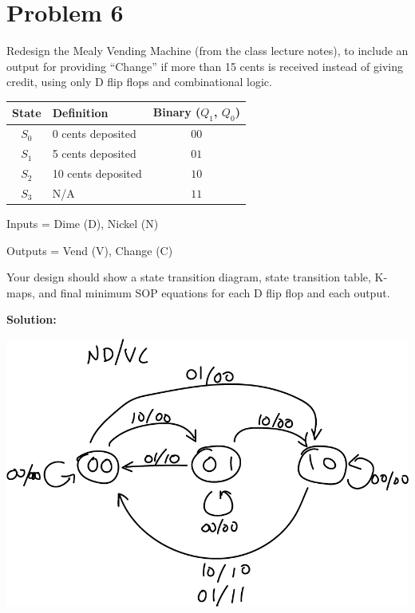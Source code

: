 \documentclass{article}
\begin{document}
    
    \section*{Problem 6}

    Redesign the Mealy Vending Machine (from the class lecture notes), to include an 
    output for providing “Change” if more than 15 cents is received instead of giving 
    credit, using only D flip flops and combinational logic.

    \begin{center}
        \begin{tabular} {|c|l|c|}
            \hline
            State & Definition & Binary ($Q_1$, $Q_0$) \\
            \hline
            $S_0$ & 0 cents deposited & $00$ \\
            $S_1$ & 5 cents deposited & $01$ \\
            $S_2$ & 10 cents deposited & $10$ \\
            $S_3$ & N/A & $11$ \\
            \hline
        \end{tabular}
    \end{center}

    Inputs = Dime (D), Nickel (N)

    Outputs = Vend (V), Change (C)

    Your design should show a state transition diagram, state transition table, K-maps, 
    and final minimum SOP equations for each D flip flop and each output.

    \textbf{Solution:}

    \begin{center}
        \includegraphics[scale=0.3]{Q6_State_diagram.png}
    \end{center}
\end{document}
